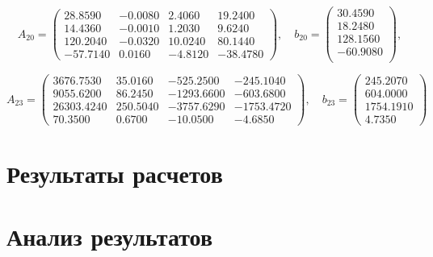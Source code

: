 \documentclass[12pt, a4paper]{article}
\begin{document}
\[
    A_{20} = 
    \begin{pmatrix}
     28.8590    &    -0.0080    &     2.4060    &    19.2400    \\   
     14.4360    &    -0.0010    &     1.2030    &     9.6240    \\   
    120.2040    &    -0.0320    &    10.0240    &    80.1440    \\  
    -57.7140    &     0.0160    &    -4.8120    &   -38.4780       

    \end{pmatrix}, \quad b_{20} = 
    \begin{pmatrix}
    30.4590  \\
    18.2480  \\
    128.1560 \\
    -60.9080 \\
    \end{pmatrix},
\]

\[
    A_{23} = 
    \begin{pmatrix}
        3676.7530 &    35.0160   &    -525.2500 &    -245.1040 \\
        9055.6200  &    86.2450   &   -1293.6600 &   -603.6800  \\
        26303.4240  &    250.5040  &  -3757.6290  &  -1753.4720  \\
        70.3500  &      0.6700  &   -10.0500   &    -4.6850   
    \end{pmatrix}, \quad b_{23} = 
    \begin{pmatrix}
        245.2070 \\
       604.0000  \\
      1754.1910  \\
         4.7350  
    \end{pmatrix}
\]

\newpage

\section{Результаты расчетов}
\newpage

\section{Анализ результатов}
\newpage
\end{document}
